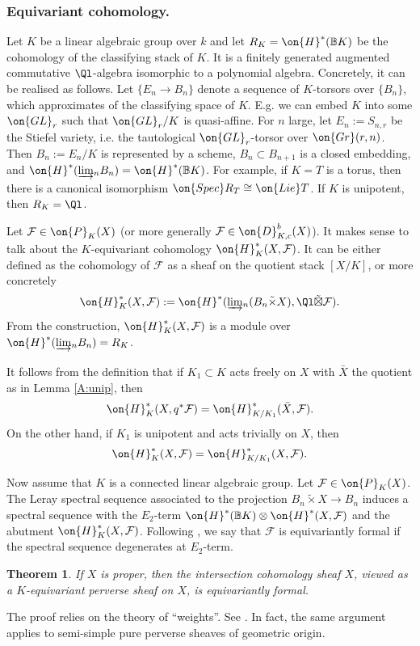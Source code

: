 \documentclass[]{pcmi}
\theoremstyle{plain}
\newtheorem{thm}[equation]{Theorem}
\theoremstyle{remark}
\theoremstyle{definition}
\newcommand{\bB}{{\mathbb B}}
\newcommand{\mF}{{\mathcal F}}
\newcommand{\Gr}{{\on{Gr}}}
\newcommand{\Lie}{{\on{Lie}}}
\newcommand{\Spec}{\on{Spec}}
\newcommand{\GL}{{\on{GL}}}
\begin{document}
\subsubsection{Equivariant cohomology.}\label{A:char class}
Let $K$ be a linear algebraic group over $k$ and let $R_{K}=\on{H}^*(\bB K)$ be the cohomology of the classifying stack of $K$. It is a finitely generated augmented commutative $\Ql$-algebra isomorphic to a polynomial algebra. Concretely, it can be realised as follows. Let  $\{E_n\to B_n\}$ denote a sequence of $K$-torsors over $\{B_n\}$, which approximates of the classifying space of $K$. E.g. we can embed $K$ into some $\GL_r$ such that $\GL_r/K$ is quasi-affine. For $n$ large, let $E_n:=S_{n,r}$ be the Stiefel variety, i.e. the tautological $\GL_r$-torsor over $\Gr(r,n)$. Then $B_n:=E_n/K$ is represented by a scheme, $B_n\subset B_{n+1}$ is a closed embedding, and $\on{H}^*(\underrightarrow\lim_n B_n)= \on{H}^*(\bB K)$. 
For example, if $K=T$ is a torus, then there is a canonical isomorphism $\Spec R_T\cong \Lie T$. If $K$ is unipotent, then $R_K=\Ql$. 


Let $\mF\in \on{P}_K(X)$ (or more generally $\mF\in\on{D}^b_{K,c}(X)$). It makes sense to talk about the $K$-equivariant cohomology $\on{H}_K^*(X,\mF)$. It can be either defined as the cohomology of $\mF$ as a sheaf on the quotient stack $[X/K]$, or more concretely
$$\on{H}_K^*(X,\mF):=\on{H}^*(\underrightarrow\lim_n (B_n\tilde\times X), \Ql\tilde\boxtimes \mF).$$
From the construction, $\on{H}^*_K(X,\mF)$ is a module over $\on{H}^*(\underrightarrow\lim_n B_n)=R_{K}$. 

It follows from the definition that if $K_1\subset K$ acts freely on $X$ with $\bar X$ the quotient as in Lemma \ref{A:unip}, then
\begin{equation}\label{coh free action}
\on{H}^*_K(X,q^*\mF)=\on{H}^*_{K/K_1}(\bar X,\mF).
\end{equation}
On the other hand, if $K_1$ is unipotent and acts trivially on $X$, then
\begin{equation}\label{coh unip}
\on{H}^*_K(X,\mF)=\on{H}^*_{K/K_1}(X,\mF).
\end{equation}


Now assume that $K$ is a connected linear algebraic group. Let $\mF\in\on{P}_K(X)$. The Leray spectral sequence associated to the projection $B_n\tilde\times X\to B_n$ induces a spectral sequence with the $E_2$-term $\on{H}^*(\bB K)\otimes \on{H}^*(X,\mF)$ and the abutment $\on{H}^*_K(X,\mF)$. Following \cite{GKM}, we say that $\mF$ is equivariantly formal if the spectral sequence degenerates at $E_2$-term. 
\begin{thm}
If $X$ is proper, then the intersection cohomology sheaf $X$, viewed as a $K$-equivariant perverse sheaf on $X$, is equivariantly formal. 
\end{thm}
The proof relies on the theory of ``weights''. See \cite[Theorem 14.1]{GKM}. In fact, the same argument applies to semi-simple pure perverse sheaves of geometric origin.
\end{document}
